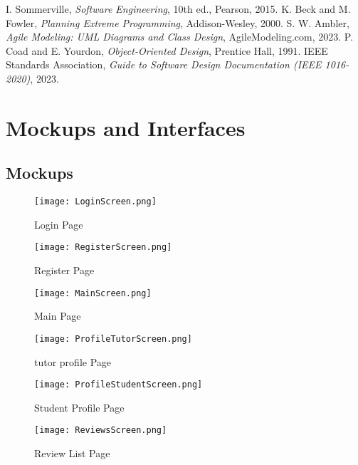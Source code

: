 \documentclass[12pt,a4paper]{report}
\begin{document}
\begin{thebibliography}{99}
 I. Sommerville, \textit{Software Engineering}, 10th ed., Pearson, 2015.
 K. Beck and M. Fowler, \textit{Planning Extreme Programming}, Addison-Wesley, 2000.
 S. W. Ambler, \textit{Agile Modeling: UML Diagrams and Class Design}, AgileModeling.com, 2023.
 P. Coad and E. Yourdon, \textit{Object-Oriented Design}, Prentice Hall, 1991.
 IEEE Standards Association, \textit{Guide to Software Design Documentation (IEEE 1016-2020)}, 2023.
\end{thebibliography}


\appendix



\chapter{Mockups and Interfaces}
\section{Mockups}
\begin{figure}[h!]
\centering
\texttt{[image: LoginScreen.png]}
\caption{Login Page}
\end{figure}


\begin{figure}[h!]
\centering
\texttt{[image: RegisterScreen.png]}
\caption{Register Page}
\end{figure}

        
\newpage


\begin{figure}[h!]
\centering
\texttt{[image: MainScreen.png]}
\caption{Main Page}
\end{figure}


\begin{figure}[h!]
\centering
\texttt{[image: ProfileTutorScreen.png]}
\caption{tutor profile Page}
\end{figure}

\newpage


\begin{figure}[h!]
\centering
\texttt{[image: ProfileStudentScreen.png]}
\caption{Student Profile Page}
\end{figure}


\begin{figure}[h!]
\centering
\texttt{[image: ReviewsScreen.png]}
\caption{Review List Page}
\end{figure}
\end{document}
